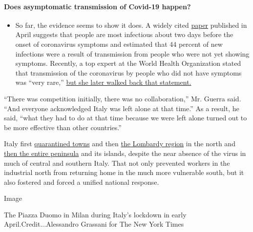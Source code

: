 \begin{itemize}
{  \paragraph{Does asymptomatic transmission of Covid-19
  happen?}\label{does-asymptomatic-transmission-of-covid-19-happen}}

  \begin{itemize}
  \tightlist
  \item
    So far, the evidence seems to show it does. A widely cited
    \href{https://www.nature.com/articles/s41591-020-0869-5}{paper}
    published in April suggests that people are most infectious about
    two days before the onset of coronavirus symptoms and estimated that
    44 percent of new infections were a result of transmission from
    people who were not yet showing symptoms. Recently, a top expert at
    the World Health Organization stated that transmission of the
    coronavirus by people who did not have symptoms was ``very rare,''
    \href{https://www.nytimes3xbfgragh.onion/2020/06/09/world/coronavirus-updates.html?action=click\&pgtype=Article\&state=default\&region=MAIN_CONTENT_3\&context=storylines_faq\#link-1f302e21}{but
    she later walked back that statement.}
  \end{itemize}
\end{itemize}

``There was competition initially, there was no collaboration,'' Mr.
Guerra said. ``And everyone acknowledged Italy was left alone at that
time.'' As a result, he said, ``what they had to do at that time because
we were left alone turned out to be more effective than other
countries.''

Italy first
\href{https://www.nytimes3xbfgragh.onion/2020/02/23/world/europe/italy-coronavirus.html}{quarantined
towns} and then
\href{https://www.nytimes3xbfgragh.onion/2020/03/07/world/europe/coronavirus-italy.html}{the
Lombardy region} in the north and
\href{https://www.nytimes3xbfgragh.onion/2020/03/09/world/europe/italy-lockdown-coronavirus.html}{then
the entire peninsula} and its islands, despite the near absence of the
virus in much of central and southern Italy. That not only prevented
workers in the industrial north from returning home in the much more
vulnerable south, but it also fostered and forced a unified national
response.

Image

The Piazza Duomo in Milan during Italy's lockdown in early
April.Credit...Alessandro Grassani for The New York Times


